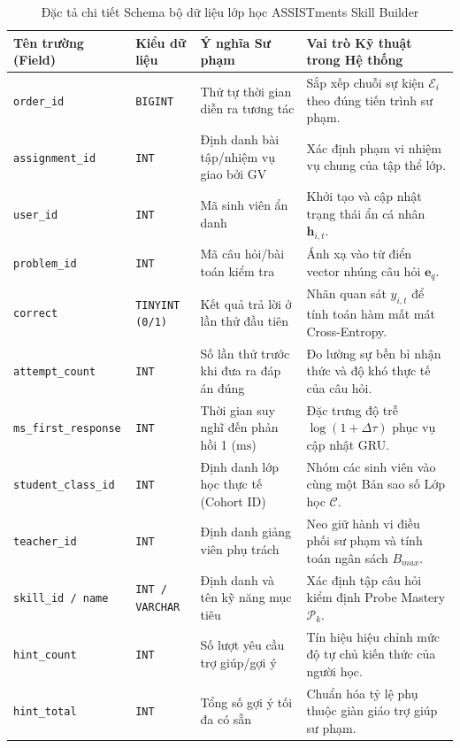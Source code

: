 \begin{table}[htbp]
  \centering\small
  \caption{Đặc tả chi tiết Schema bộ dữ liệu lớp học ASSISTments Skill Builder}\label{tab:assistments-schema-full}
  \begin{tabularx}{\textwidth}{p{3.2cm} p{2.2cm} p{4.2cm} X}
    \toprule
    \textbf{Tên trường (Field)} & \textbf{Kiểu dữ liệu} & \textbf{Ý nghĩa Sư phạm} & \textbf{Vai trò Kỹ thuật trong Hệ thống} \\
    \midrule
    \texttt{order\_id} & \texttt{BIGINT} & Thứ tự thời gian diễn ra tương tác & Sắp xếp chuỗi sự kiện $\mathcal{E}_i$ theo đúng tiến trình sư phạm. \\
    \addlinespace
    \texttt{assignment\_id} & \texttt{INT} & Định danh bài tập/nhiệm vụ giao bởi GV & Xác định phạm vi nhiệm vụ chung của tập thể lớp. \\
    \addlinespace
    \texttt{user\_id} & \texttt{INT} & Mã sinh viên ẩn danh & Khởi tạo và cập nhật trạng thái ẩn cá nhân $\mathbf{h}_{i, t}$. \\
    \addlinespace
    \texttt{problem\_id} & \texttt{INT} & Mã câu hỏi/bài toán kiểm tra & Ánh xạ vào từ điển vector nhúng câu hỏi $\mathbf{e}_q$. \\
    \addlinespace
    \texttt{correct} & \texttt{TINYINT (0/1)} & Kết quả trả lời ở lần thử đầu tiên & Nhãn quan sát $y_{i, t}$ để tính toán hàm mất mát Cross-Entropy. \\
    \addlinespace
    \texttt{attempt\_count} & \texttt{INT} & Số lần thử trước khi đưa ra đáp án đúng & Đo lường sự bền bỉ nhận thức và độ khó thực tế của câu hỏi. \\
    \addlinespace
    \texttt{ms\_first\_response} & \texttt{INT} & Thời gian suy nghĩ đến phản hồi 1 ($\text{ms}$) & Đặc trưng độ trễ $\log(1 + \Delta \tau)$ phục vụ cập nhật GRU. \\
    \addlinespace
    \texttt{student\_class\_id} & \texttt{INT} & Định danh lớp học thực tế (Cohort ID) & Nhóm các sinh viên vào cùng một Bản sao số Lớp học $\mathcal{C}$. \\
    \addlinespace
    \texttt{teacher\_id} & \texttt{INT} & Định danh giảng viên phụ trách & Neo giữ hành vi điều phối sư phạm và tính toán ngân sách $B_{max}$. \\
    \addlinespace
    \texttt{skill\_id / name} & \texttt{INT / VARCHAR} & Định danh và tên kỹ năng mục tiêu & Xác định tập câu hỏi kiểm định Probe Mastery $\mathcal{P}_k$. \\
    \addlinespace
    \texttt{hint\_count} & \texttt{INT} & Số lượt yêu cầu trợ giúp/gợi ý & Tín hiệu hiệu chỉnh mức độ tự chủ kiến thức của người học. \\
    \addlinespace
    \texttt{hint\_total} & \texttt{INT} & Tổng số gợi ý tối đa có sẵn & Chuẩn hóa tỷ lệ phụ thuộc giàn giáo trợ giúp sư phạm. \\
    \bottomrule
  \end{tabularx}
\end{table}

